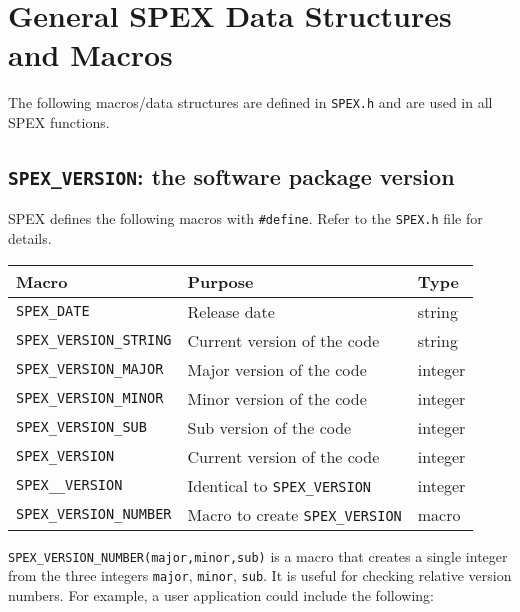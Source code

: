 \documentclass[12pt,oneside]{book}
\theoremstyle{definition}
\newenvironment{SizedCenteredTabular}[2][\small]
    {   
        #1\begin{center}\begin{tabular}{#2}
    }{ 
        \end{tabular}\end{center}
    }
\begin{document}
\chapter{General SPEX Data Structures and Macros}\vspace{-0.75in}

The following macros/data structures are defined in \verb|SPEX.h| and are used in all SPEX functions.

\section{\texttt{SPEX\_VERSION}: the software package version}
SPEX defines the following macros with \verb|#define|. Refer to
the \verb|SPEX.h| file for details.

\begin{SizedCenteredTabular}{lll} \hline
    Macro                    & Purpose                      & Type \\ \hline
   \verb'SPEX_DATE'           & Release date                & string \\
   \verb|SPEX_VERSION_STRING| & Current version of the code & string \\
   \verb|SPEX_VERSION_MAJOR|  & Major version of the code   & integer \\
   \verb|SPEX_VERSION_MINOR|  & Minor version of the code   & integer \\
   \verb|SPEX_VERSION_SUB|    & Sub version of the code     & integer \\
   \verb"SPEX_VERSION"        & Current version of the code & integer \\
   \verb"SPEX__VERSION"       & Identical to \verb'SPEX_VERSION' & integer \\
   \verb"SPEX_VERSION_NUMBER" & Macro to create \verb'SPEX_VERSION' & macro \\
   \hline
\end{SizedCenteredTabular}

\verb'SPEX_VERSION_NUMBER(major,minor,sub)' is a macro that creates a single
integer from the three integers \verb'major', \verb'minor', \verb'sub'.  It is
useful for checking relative version numbers.  For example, a user application
could include the following:
\end{document}
